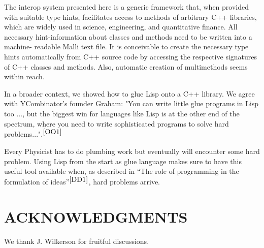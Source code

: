 \documentclass[twocolumn]{article}
\begin{document}
The interop system presented here is a generic framework that, when provided with suitable type hints, facilitates access to methods of arbitrary C++ libraries, which are widely used in science, engineering, and quantitative finance. All necessary hint-information about classes and methods need to be written into a machine- readable Malli text file. It is conceivable to create the necessary type hints automatically from C++ source code by accessing the respective signatures of C++ classes and methods. Also, automatic creation of multimethods seems within reach.

In a broader context, we showed how to glue Lisp onto a C++ library. We agree with YCombinator's founder Graham: "You can write little glue programs in Lisp too ..., but the biggest win for languages like Lisp is at the other end of the spectrum, where you need to write sophisticated programs to solve hard problems...".$^{\cite{OO1}}$

Every Physicist has to do plumbing work but eventually will encounter some  hard problem. Using Lisp from the start as glue language makes sure to have this useful tool available when, as described in “The role of programming in the formulation of ideas”$^{\cite{DD1}}$, hard problems arrive.

\section{ACKNOWLEDGMENTS}
We thank J. Wilkerson for fruitful discussions.
\end{document}
